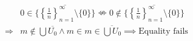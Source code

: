 \documentclass{article}
\begin{document}
\begin{equation*}
    \begin{split}
        &0\in \overline{\{\left\{\frac{1}{n}\right\}^{\infty}_{n=1}\setminus\{0\}\}}\nLeftrightarrow0\notin \overline{\{\left\{\frac{1}{n}\right\}^{\infty}_{n=1}\setminus\{0\}\}}\\
        \Rightarrow&m\notin \bigcup \overline{U_0}\land m\in m\in \overline{\bigcup U_0}\implies\text{Equality fails}\\
    \end{split}
\end{equation*}
\end{document}
